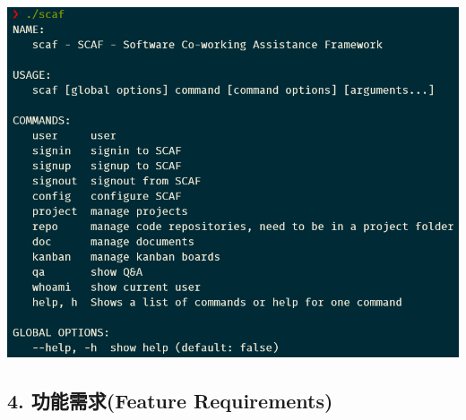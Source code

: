 \documentclass{report}
\begin{document}
\begin{enumerate}[label=(\Alph*)]
  \includegraphics[width=\textwidth]{assets/wireframe/cli.png}
\end{enumerate}

\subsection*{4. 功能需求(Feature Requirements)}               
\end{document}
